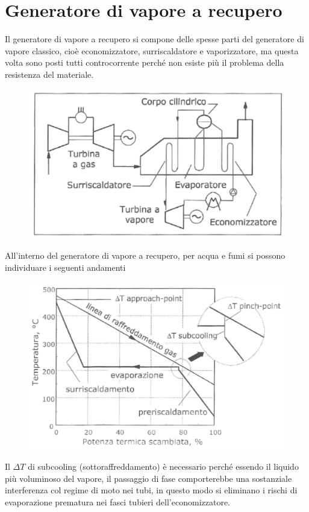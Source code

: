 \newpage


\section{Generatore di vapore a recupero}
\begin{adjustwidth}{2in}{}
	Il generatore di vapore a recupero si compone delle spesse parti del generatore di vapore classico, cioè economizzatore, surriscaldatore e vaporizzatore, ma questa volta sono posti tutti controcorrente perché non esiste più il problema della resistenza del materiale.
\begin{figure}[H]
	\centering
	\includegraphics[width=0.5\linewidth]{immagini/impianticombinati8}
	\label{fig:impianticombinati8}
\end{figure}
	All'interno del generatore di vapore a recupero, per acqua e fumi si possono individuare i seguenti andamenti	
\begin{figure}[H]
	\centering
	\includegraphics[width=0.7\linewidth]{immagini/impianticombinati9}
	\label{fig:impianticombinati9}
\end{figure}
	Il $\Delta T$ di subcooling (sottoraffreddamento) è necessario perché essendo il liquido più voluminoso del vapore, il passaggio di fase comporterebbe una sostanziale interferenza col regime di moto nei tubi, in questo modo si eliminano i rischi di evaporazione prematura nei fasci tubieri dell'economizzatore. 
\end{adjustwidth}



